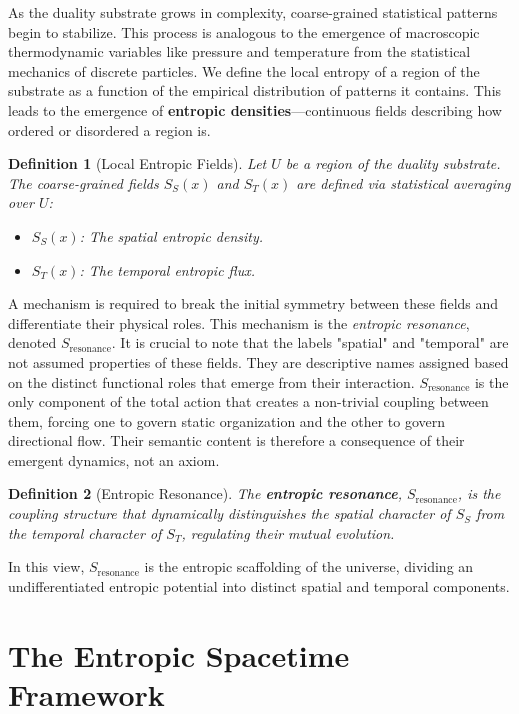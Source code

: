\documentclass[12pt, a4paper]{article}
\newtheorem{definition}{Definition}[section]
\begin{document}
As the duality substrate grows in complexity, coarse-grained statistical patterns begin to stabilize. This process is analogous to the emergence of macroscopic thermodynamic variables like pressure and temperature from the statistical mechanics of discrete particles. We define the local entropy of a region of the substrate as a function of the empirical distribution of patterns it contains. This leads to the emergence of \textbf{entropic densities}—continuous fields describing how ordered or disordered a region is.

\begin{definition}[Local Entropic Fields]
Let $U$ be a region of the duality substrate. The coarse-grained fields \( S_S(x) \) and \( S_T(x) \) are defined via statistical averaging over $U$:
\begin{itemize}
    \item \( S_S(x) \): The spatial entropic density.
    \item \( S_T(x) \): The temporal entropic flux.
\end{itemize}
\end{definition}

A mechanism is required to break the initial symmetry between these fields and differentiate their physical roles. This mechanism is the \emph{entropic resonance}, denoted \( S_{\mathrm{resonance}} \). It is crucial to note that the labels "spatial" and "temporal" are not assumed properties of these fields. They are descriptive names assigned based on the distinct functional roles that emerge from their interaction. \(S_{\mathrm{resonance}}\) is the only component of the total action that creates a non-trivial coupling between them, forcing one to govern static organization and the other to govern directional flow. Their semantic content is therefore a consequence of their emergent dynamics, not an axiom.

\begin{definition}[Entropic Resonance]
The \textbf{entropic resonance}, \( S_{\mathrm{resonance}} \), is the coupling structure that dynamically distinguishes the spatial character of \(S_S\) from the temporal character of \(S_T\), regulating their mutual evolution.
\end{definition}

In this view, \( S_{\mathrm{resonance}} \) is the entropic scaffolding of the universe, dividing an undifferentiated entropic potential into distinct spatial and temporal components.


\section{The Entropic Spacetime Framework}
\label{sec:framework}
\end{document}
